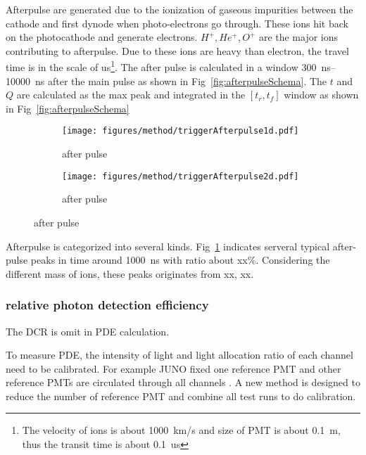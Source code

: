Afterpulse are generated due to the ionization of gaseous impurities between the cathode and first dynode when photo-electrons go through\cite{Coates_1973}. These ions hit back on the photocathode and generate electrons. $H^+,He^+,O^+$ are the major ions contributing to afterpulse\cite{Coates_1973}. Due to these ions are heavy than electron, the travel time is in the scale of \si{us}\footnote{The velocity of ions is about \SI{1000}{km/s} and size of PMT is about \SI{0.1}{m}, thus the transit time is about \SI{0.1}{us}}. The after pulse is calculated in a window \SIrange{300}{10000}{ns} after the main pulse as shown in Fig~\ref{fig:afterpulseSchema}. The $t$ and $Q$ are calculated as the max peak and integrated in the $[t_r,t_f]$ window as shown in Fig~\ref{fig:afterpulseSchema}
\begin{figure}[!htbp]
    \centering
    \begin{subfigure}[t]{0.8\textwidth}
        \texttt{[image: figures/method/triggerAfterpulse1d.pdf]}
        \caption{after pulse}
        \label{fig:afterpulse1d}
    \end{subfigure}
    \begin{subfigure}[t]{0.8\textwidth}
        \texttt{[image: figures/method/triggerAfterpulse2d.pdf]}
        \caption{after pulse}
        \label{fig:afterpulse2d}
    \end{subfigure}
\end{figure}

Afterpulse is categorized into several kinds. Fig~\ref{fig:afterpulse1d} indicates serveral typical after-pulse peaks in time around \SI{1000}{ns} with ratio about xx\%. Considering the different mass of ions, these peaks originates from xx, xx.

\subsubsection{relative photon detection efficiency}
The DCR is omit in PDE calculation.

To measure PDE, the intensity of light and light allocation ratio of each channel need to be calibrated. For example JUNO fixed one reference PMT and other reference PMTs are circulated through all channels \cite{Wonsak_2021}. A new method is designed to reduce the number of reference PMT and combine all test runs to do calibration.  

